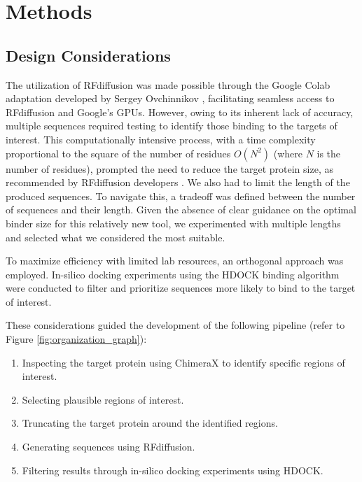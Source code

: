 \documentclass[11pt,a4paper]{article}
\begin{document}
\section{Methods}

\subsection{Design Considerations}

The utilization of RFdiffusion was made possible through the Google Colab adaptation developed by Sergey Ovchinnikov \cite{ovchinnikov2023colab}, facilitating seamless access to RFdiffusion and Google's GPUs. However, owing to its inherent lack of accuracy, multiple sequences required testing to identify those binding to the targets of interest. This computationally intensive process, with a time complexity proportional to the square of the number of residues $O(N^2)$ (where $N$ is the number of residues), prompted the need to reduce the target protein size, as recommended by RFdiffusion developers \cite{rfdiffusion_github}. We also had to limit the length of the produced sequences. To navigate this, a tradeoff was defined between the number of sequences and their length. Given the absence of clear guidance on the optimal binder size for this relatively new tool, we experimented with multiple lengths and selected what we considered the most suitable.

To maximize efficiency with limited lab resources, an 
orthogonal approach was employed. In-silico docking experiments using 
the HDOCK binding algorithm were conducted to filter and prioritize 
sequences more likely to bind to the target of interest.

These considerations guided the development of the following pipeline 
(refer to Figure \ref{fig:organization_graph}):

\begin{enumerate}
    \item Inspecting the target protein using ChimeraX to identify 
    specific regions of interest.
    \item Selecting plausible regions of interest.
    \item Truncating the target protein around the identified regions.
    \item Generating sequences using RFdiffusion.
    \item Filtering results through in-silico docking experiments using 
    HDOCK.
\end{enumerate}
\end{document}
